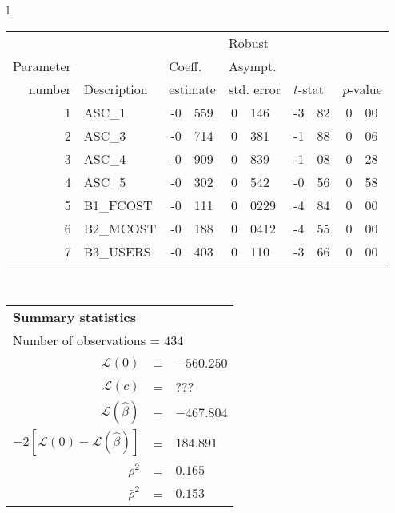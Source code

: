   \begin{tabular}{l}
\begin{tabular}{rlr@{.}lr@{.}lr@{.}lr@{.}l}
         &                       &   \multicolumn{2}{l}{}    & \multicolumn{2}{l}{Robust}  &     \multicolumn{4}{l}{}   \\
Parameter &                       &   \multicolumn{2}{l}{Coeff.}      & \multicolumn{2}{l}{Asympt.}  &     \multicolumn{4}{l}{}   \\
number &  Description                     &   \multicolumn{2}{l}{estimate}      & \multicolumn{2}{l}{std. error}  &   \multicolumn{2}{l}{$t$-stat}  &   \multicolumn{2}{l}{$p$-value}   \\

\hline

1 & ASC\_1 & -0&559 & 0&146 & -3&82 & 0&00 \\
2 & ASC\_3 & -0&714 & 0&381 & -1&88 & 0&06 \\
3 & ASC\_4 & -0&909 & 0&839 & -1&08 & 0&28 \\
4 & ASC\_5 & -0&302 & 0&542 & -0&56 & 0&58 \\
5 & B1\_FCOST & -0&111 & 0&0229 & -4&84 & 0&00 \\
6 & B2\_MCOST & -0&188 & 0&0412 & -4&55 & 0&00 \\
7 & B3\_USERS & -0&403 & 0&110 & -3&66 & 0&00 \\
\hline

\end{tabular}
\\
\begin{tabular}{rcl}
\multicolumn{3}{l}{\bf Summary statistics}\\
\multicolumn{3}{l}{ Number of observations = $434$} \\
 $\mathcal{L}(0)$ &=&  $-560.250$ \\
 $\mathcal{L}(c)$ &=& ???\\
 $\mathcal{L}(\hat{\beta})$ &=& $-467.804 $  \\
 $-2[\mathcal{L}(0) -\mathcal{L}(\hat{\beta})]$ &=& $184.891$ \\
    $\rho^2$ &=&   $0.165$ \\
    $\bar{\rho}^2$ &=&    $0.153$ \\
\end{tabular}
\end{tabular}

